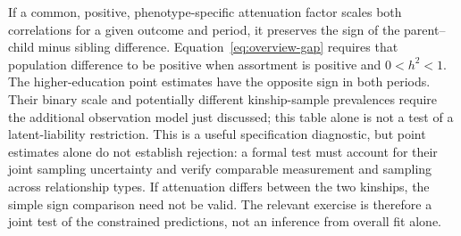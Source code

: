 If a common, positive, phenotype-specific attenuation factor scales
both correlations for a given outcome and period, it preserves the sign
of the parent--child minus sibling difference. Equation~\eqref{eq:overview-gap}
requires that population difference to be positive when assortment is
positive and $0<h^2<1$. The higher-education point estimates have the
opposite sign in both periods. Their binary scale and potentially different
kinship-sample prevalences require the additional observation model just
discussed; this table alone is not a test of a latent-liability restriction. This is a useful specification diagnostic,
but point estimates alone do not establish rejection: a formal test must
account for their joint sampling uncertainty and verify comparable
measurement and sampling across relationship types. If attenuation differs
between the two kinships, the simple sign comparison need not be valid.
The relevant exercise is therefore a joint test of the constrained
predictions, not an inference from overall fit alone.
